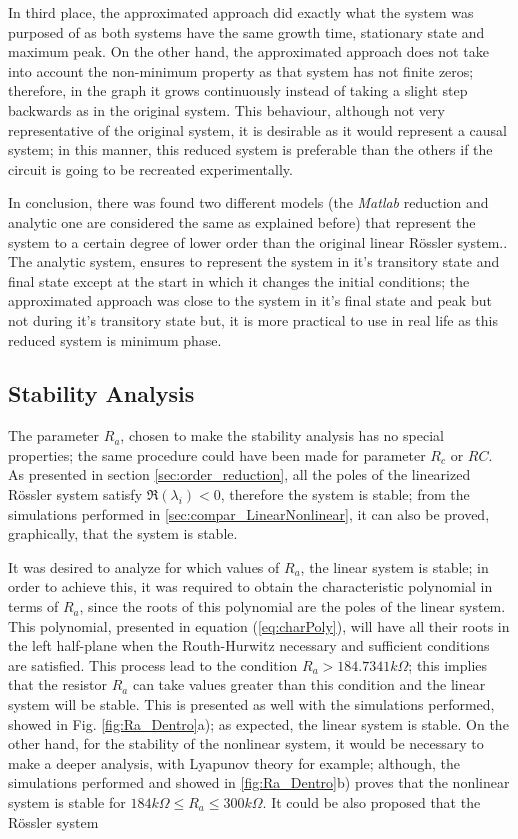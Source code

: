 In third place, the approximated approach did exactly what the system was purposed of as both systems have the same growth time, stationary state and maximum peak. On the other hand, the approximated approach does not take into account the non-minimum property as that system has not finite zeros; therefore, in the graph it grows continuously instead of taking a slight step backwards as in the original system. This behaviour, although not very representative of the original system, it is desirable as it would represent a causal system; in this manner, this reduced system is preferable than the others if the circuit is going to be recreated experimentally.

In conclusion, there was found two different models (the \textit{Matlab} reduction and analytic one are considered the same as explained before) that represent the system to a certain degree of lower order than the original linear Rössler system.. The analytic system, ensures to represent the system in it's transitory state and final state except at the start in which it changes the initial conditions; the approximated approach was close to the system in it's final state and peak but not during it's transitory state but, it is more practical to use in real life as this reduced system is minimum phase.

\subsection{Stability Analysis}
The parameter $R_a$, chosen to make the stability analysis has no special properties; the same procedure could have been made for parameter $R_c$ or $RC$. As presented in section \ref{sec:order_reduction}, all the poles of the linearized Rössler system satisfy $\Re(\lambda_i)<0$, therefore the system is stable; from the simulations performed in \ref{sec:compar_LinearNonlinear}, it can also be proved, graphically, that the system is stable.

It was desired to analyze for which values of $R_a$, the linear system is stable; in order to achieve this, it was required to obtain the characteristic polynomial in terms of $R_a$, since the roots of this polynomial are the poles of the linear system. This polynomial, presented in equation (\ref{eq:charPoly}), will have all their roots in the left half-plane when the Routh-Hurwitz necessary and sufficient conditions are satisfied. This process lead to the condition $R_a>184.7341k\Omega$; this implies that the resistor $R_a$ can take values greater than this condition and the linear system will be stable. This is presented as well with the simulations performed, showed in Fig. \ref{fig:Ra_Dentro}a); as expected, the linear system is stable. On the other hand, for the stability of the nonlinear system, it would be necessary to make a deeper analysis, with Lyapunov theory for example; although, the simulations performed and showed in \ref{fig:Ra_Dentro}b) proves that the nonlinear system is stable for $184k\Omega\leq R_a\leq300k\Omega$. It could be also proposed that the Rössler system 

